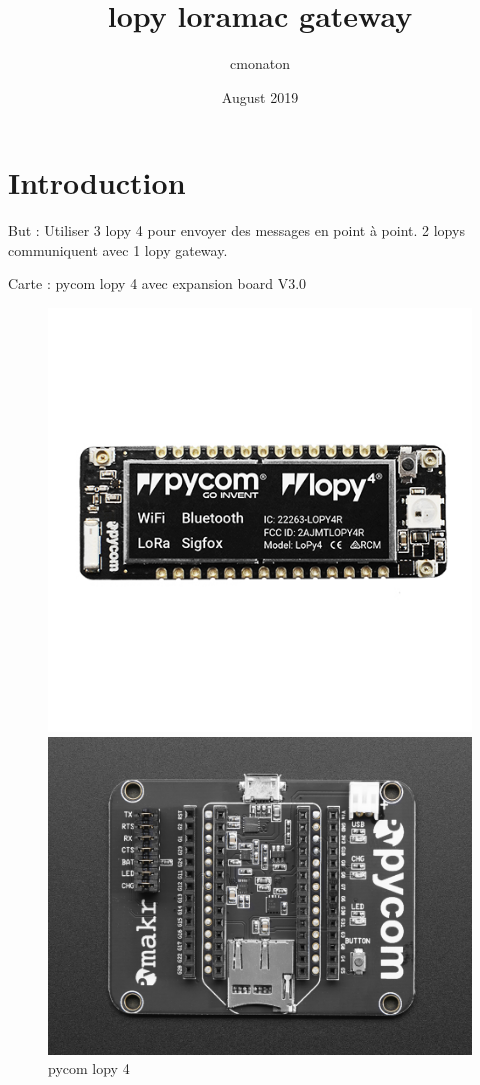 \documentclass{article}
\title{lopy loramac gateway}
\author{cmonaton }
\date{August 2019}
\begin{document}
\maketitle

\section{Introduction}
But : Utiliser 3 lopy 4 pour envoyer des messages en point à point. 2 lopys communiquent avec 1 lopy gateway.

Carte : pycom lopy 4 avec expansion board V3.0



\begin{figure}[H]
  \centering
  \begin{minipage}[b]{0.4\textwidth}
    \includegraphics[keepaspectratio=true,scale=1.7]{pycom_lopy4.jpeg}
        \caption{pycom lopy 4}
  \end{minipage}
  \hfill
  \begin{minipage}[b]{0.4\textwidth}
   \includegraphics[keepaspectratio=true,scale=0.5]{pycom_expansion_board.jpeg}

\end{minipage}
\end{figure}
\end{document}
